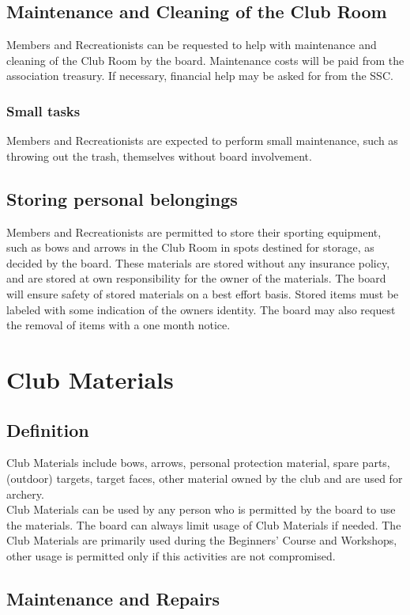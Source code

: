 \documentclass[a4paper]{article}
\begin{document}
\subsection{Maintenance and Cleaning of the Club Room}
Members and Recreationists can be requested to help with maintenance and cleaning of the Club Room by the board. Maintenance costs will be paid from the association treasury. If necessary, financial help may be asked for from the SSC.

\subsubsection{Small tasks}
Members and Recreationists are expected to perform small maintenance, such as throwing out the trash, themselves without board involvement.

\subsection{Storing personal belongings}
Members and Recreationists are permitted to store their sporting equipment, such as bows and arrows in the Club Room in spots destined for storage, as decided by the board. These materials are stored without any insurance policy, and are stored at own responsibility for the owner of the materials. The board will ensure safety of stored materials on a best effort basis. Stored items must be labeled with some indication of the owners identity. The board may also request the removal of items with a one month notice.

\section{Club Materials}
\subsection{Definition}
Club Materials include bows, arrows, personal protection material, spare parts, (outdoor) targets, target faces, other material owned by the club and are used for archery. \\

Club Materials can be used by any person who is permitted by the board to use the materials. The board can always limit usage of Club Materials if needed. The Club Materials are primarily used during the Beginners' Course and Workshops, other usage is permitted only if this activities are not compromised.

\subsection{Maintenance and Repairs}
\end{document}
